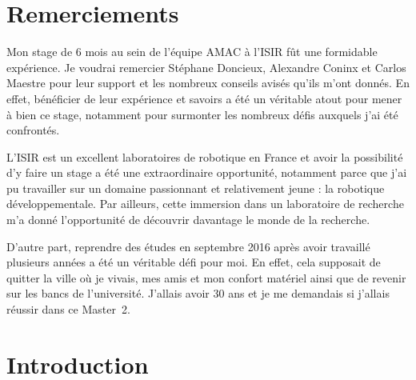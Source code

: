 \documentclass{llncs}
\begin{document}
\section*{Remerciements}

Mon stage de 6 mois au sein de l'équipe AMAC à l'ISIR fût une formidable expérience. Je voudrai remercier Stéphane Doncieux, Alexandre Coninx et Carlos Maestre pour leur support et les nombreux conseils avisés qu'ils m'ont donnés. En effet, bénéficier de leur expérience et savoirs a été un véritable atout pour mener à bien ce stage, notamment pour surmonter les nombreux défis auxquels j'ai été confrontés.

L'ISIR est un excellent laboratoires de robotique en France et avoir la possibilité d'y faire un stage a été une extraordinaire opportunité, notamment parce que j'ai pu travailler sur un domaine passionnant et relativement jeune : la robotique développementale. Par ailleurs, cette immersion dans un laboratoire de recherche m'a donné l'opportunité de découvrir davantage le monde de la recherche.

D'autre part, reprendre des études en septembre 2016 après avoir travaillé plusieurs années a été un véritable défi pour moi. En effet, cela supposait de quitter la ville où je vivais, mes amis et mon confort matériel ainsi que de revenir sur les bancs de l'université. J'allais avoir 30 ans et je me demandais si j'allais réussir dans ce Master~2.




\section{Introduction}




\end{document}
